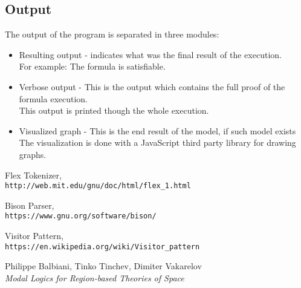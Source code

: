 \documentclass{article}
\begin{document}
		\subsection*{Output}
		The output of the program is separated in three modules:
		\begin{itemize}
			\item Resulting output - indicates what was the final result of the execution. \\
				For example: The formula is satisfiable.
			\item Verbose output - This is the output which contains the full proof of the formula execution. \\
				This output is printed though the whole execution.
			\item Visualized graph - This is the end result of the model, if such model exists \\
				The visualization is done with a JavaScript third party library for drawing graphs.
		\end{itemize}
	\newpage
	\begin{thebibliography}{9}
		Flex Tokenizer,
		\\\texttt{http://web.mit.edu/gnu/doc/html/flex\_1.html}

		Bison Parser,
		\\\texttt{https://www.gnu.org/software/bison/}

		Visitor Pattern,
		\\\texttt{https://en.wikipedia.org/wiki/Visitor\_pattern}

		Philippe Balbiani, Tinko Tinchev, Dimiter Vakarelov
		\\\textit{Modal Logics for Region-based Theories of Space}
	\end{thebibliography}
\end{document}
